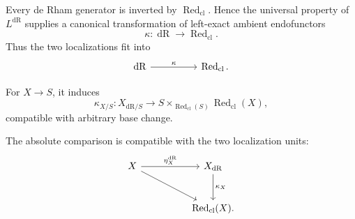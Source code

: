 \begin{theorem}
\label{thm:de-Rham-to-reduced}
Every de Rham generator is inverted by \(\operatorname{Red}_{\mathrm{cl}}\). Hence the universal
property of \(L^{\mathrm{dR}}\) supplies a canonical transformation of left-exact
ambient endofunctors
\[
  \kappa:\operatorname{dR}\longrightarrow\operatorname{Red}_{\mathrm{cl}}.
\]
Thus the two localizations fit into
\[
\begin{tikzcd}[column sep=huge]
  \operatorname{dR}
    \arrow[r,"\kappa"]
  &
  \operatorname{Red}_{\mathrm{cl}}.
\end{tikzcd}
\]

For \(X\to S\), it induces
\[
  \kappa_{X/S}:
  X_{\mathrm{dR}/S}
  \longrightarrow
  S\times_{\operatorname{Red}_{\mathrm{cl}}(S)}\operatorname{Red}_{\mathrm{cl}}(X),
\]
compatible with arbitrary base change.

The absolute comparison is compatible with the two localization units:
\[
\begin{tikzcd}[column sep=huge,row sep=large]
  X
    \arrow[r,"\eta_X^{\mathrm{dR}}"]
    \arrow[dr]
  &
  X_{\mathrm{dR}}
    \arrow[d,"\kappa_X"]
  \\
  &
  \operatorname{Red}_{\mathrm{cl}}(X).
\end{tikzcd}
\]

\end{theorem}

